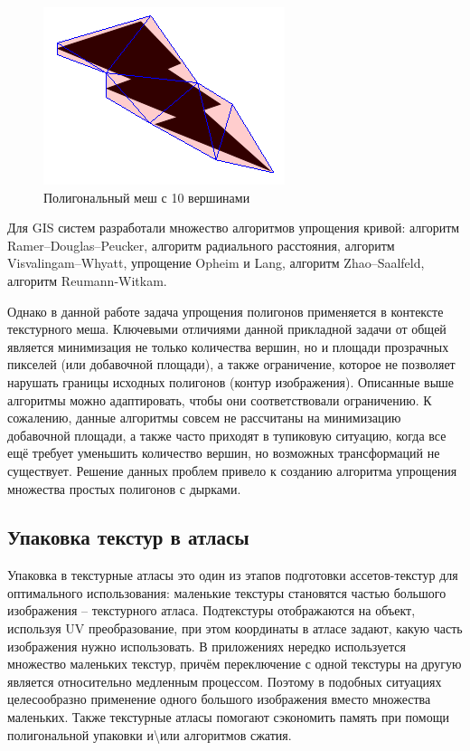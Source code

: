 \documentclass{fefu_thesis/cls/fefu}
\begin{document}
    \begin{figure}[H]
        \centering
        \includegraphics{images/Thunder_approx.png}
        \caption{Полигональный меш с 10 вершинами}
    \end{figure}

    Для GIS систем разработали множество алгоритмов упрощения кривой: алгоритм Ramer–Douglas–Peucker\cite{Ramer}\cite{DouglasPeucker}, алгоритм радиального расстояния\cite{PolylineSimplification}, алгоритм Visvalingam–Whyatt\cite{VisvalingamWhyatt}, упрощение Opheim\cite{Opheim} и Lang\cite{Lang}, алгоритм Zhao–Saalfeld\cite{ZhaoSaalfeld}, алгоритм Reumann-Witkam\cite{ReumannWitkam}.

    Однако в данной работе задача упрощения полигонов применяется в контексте текстурного меша. Ключевыми отличиями данной прикладной задачи от общей является минимизация не только количества вершин, но и площади прозрачных пикселей (или добавочной площади), а также ограничение, которое не позволяет нарушать границы исходных полигонов (контур изображения). Описанные выше алгоритмы можно адаптировать, чтобы они соответствовали ограничению. К сожалению, данные алгоритмы совсем не рассчитаны на минимизацию добавочной площади, а также часто приходят в тупиковую ситуацию, когда все ещё требует уменьшить количество вершин, но возможных трансформаций не существует. Решение данных проблем привело к созданию алгоритма упрощения множества простых полигонов с дырками.

    \subsection{Упаковка текстур в атласы}

    Упаковка в текстурные атласы это один из этапов подготовки ассетов-текстур для оптимального использования: маленькие текстуры становятся частью большого изображения -- текстурного атласа. Под­текстуры отображаются на объект, используя UV ­преобразование, при этом координаты в атласе задают, какую часть изображения нужно использовать. В приложениях нередко используется множество маленьких текстур, причём переключение с одной текстуры на другую является относительно медленным процессом. Поэтому в подобных ситуациях целесообразно применение одного большого изображения вместо множества маленьких. Также текстурные атласы помогают сэкономить память при помощи полигональной упаковки и\textbackslash или алгоритмов сжатия.
\end{document}

